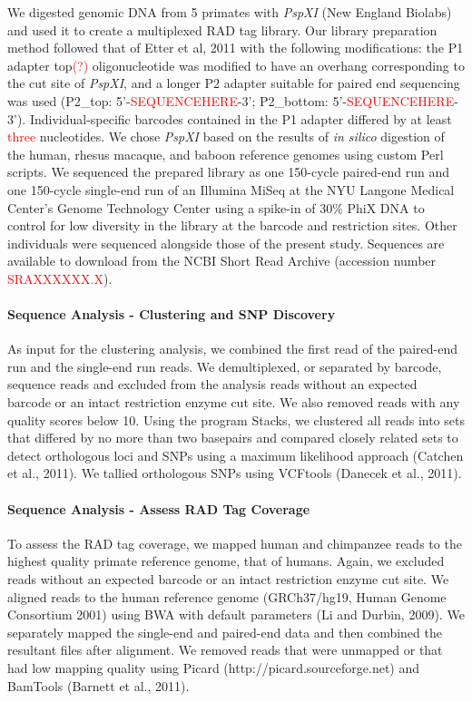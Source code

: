 \documentclass[12pt]{article}
\begin{document}
	We digested genomic DNA from 5 primates with \emph{PspXI} (New England Biolabs) and used it to create a multiplexed RAD tag library. Our library preparation method followed that of Etter et al, 2011 with the following modifications: the P1 adapter top\textcolor{red}{(?)} oligonucleotide was modified to have an overhang corresponding to the cut site of \emph{PspXI}, and a longer P2 adapter suitable for paired end sequencing was used (P2\_top: 5'-\textcolor{red}{SEQUENCEHERE}-3'; P2\_bottom: 5'-\textcolor{red}{SEQUENCEHERE}-3'). Individual-specific barcodes contained in the P1 adapter differed by at least \textcolor{red}{three} nucleotides. We chose \emph{PspXI} based on the results of \emph{in silico} digestion of the human, rhesus macaque, and baboon reference genomes using custom Perl scripts. We sequenced the prepared library as one 150-cycle paired-end run and one 150-cycle single-end run of an Illumina MiSeq at the NYU Langone Medical Center's Genome Technology Center using a spike-in of 30\% PhiX DNA to control for low diversity in the library at the barcode and restriction sites. Other individuals were sequenced alongside those of the present study. Sequences are available to download from the NCBI Short Read Archive (accession number \textcolor{red}{SRAXXXXXX.X}).

\paragraph{Sequence Analysis - Clustering and SNP Discovery}

As input for the clustering analysis, we combined the first read of the paired-end run and the single-end run reads. We demultiplexed, or separated by barcode, sequence reads and excluded from the analysis reads without an expected barcode or an intact restriction enzyme cut site. We also removed reads with any quality scores below 10. Using the program Stacks, we clustered all reads into sets that differed by no more than two basepairs and compared closely related sets to detect orthologous loci and SNPs using a maximum likelihood approach (Catchen et al., 2011). We tallied orthologous SNPs using VCFtools (Danecek et al., 2011).

\paragraph{Sequence Analysis - Assess RAD Tag Coverage}

To assess the RAD tag coverage, we mapped human and chimpanzee reads to the highest quality primate reference genome, that of humans. Again, we excluded reads without an expected barcode or an intact restriction enzyme cut site. We aligned reads to the human reference genome (GRCh37/hg19, Human Genome Consortium 2001) using BWA with default parameters (Li and Durbin, 2009). We separately mapped the single-end and paired-end data and then combined the resultant files after alignment. We removed reads that were unmapped or that had low mapping quality using Picard (http://picard.sourceforge.net) and BamTools (Barnett et al., 2011). 
\end{document}
